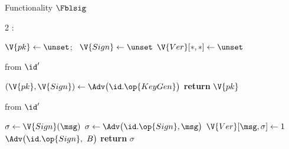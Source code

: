 \begin{interface}[nofloat]{Functionality $\Fblsig$ \\
}

{\scriptsize
\setlength{\columnsep}{1.4em}
\begin{multicols}{2}
:
\begin{algorithmic}[1]
\setcounter{contline}{0}\algcont
\State $\V{pk} \gets \unset$; \ $\V{Sign} \gets \unset$
\State $\V{Ver}[*,*] \gets \unset$
\algsave
\end{algorithmic}
\vspace{1.4ex}

 \quad from $\id'$
\begin{algorithmic}[1]
\algcont
{} \label{ln:blsbank}
\State $(\V{pk}, \V{Sign}) \gets \Adv\bigl(\id.\op{KeyGen}\bigr)$ \label{ln:blsalg}
\State \textbf{return} $\V{pk}$
\algsave
\end{algorithmic}
\vspace{1.4ex}

 \quad from $\id'$
\begin{algorithmic}[1]
\algcont
{}
 \label{ln:blshonest}
  \State $\sigma \gets \V{Sign}(\msg)$ \label{ln:blsblind}
\EndIf
{}
  \State $\sigma \gets \Adv\bigl(\id.\op{Sign}, \msg\bigr)$
   \label{ln:blsabort}
\EndIf
\State $\V{Ver}[\msg, \sigma] \gets 1$ \label{ln:blsrecord}
\State $\Adv\bigl(\id.\op{Sign},\ B\bigr)$ \label{ln:blscount}
\State \textbf{return} $\sigma$
\algsave
\end{algorithmic}
\vspace{1.4ex}

\columnbreak


\end{multicols}}
\end{interface}
